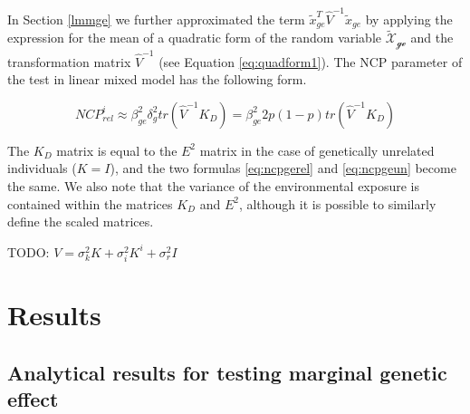 \documentclass[]{book}
\begin{document}
In Section \ref{lmmge} we further approximated the term
\(\tilde{x}_{ge}^T \hat{V}^{-1} \tilde{x}_{ge}\) by applying the
expression for the mean of a quadratic form of the random variable
\(\mathcal{\tilde{X}_{ge}}\) and the transformation matrix
\(\hat{V}^{-1}\) (see Equation \eqref{eq:quadform1}). The NCP parameter of
the test in linear mixed model has the following form.

\begin{equation}
NCP_{rel}^i \approx \beta_{ge}^2 \delta_g^2 tr(\hat{V}^{-1} K_{D}) = \beta_{ge}^2 2 p (1 - p) tr(\hat{V}^{-1} K_{D})
\label{eq:ncpgerel}
\end{equation}

The \(K_{D}\) matrix is equal to the \(E^2\) matrix in the case of
genetically unrelated individuals (\(K = I\)), and the two formulas
\eqref{eq:ncpgerel} and \eqref{eq:ncpgeun} become the same. We also note
that the variance of the environmental exposure is contained within the
matrices \(K_{D}\) and \(E^2\), although it is possible to similarly
define the scaled matrices.

TODO: \(V = \sigma^2_k K + \sigma^2_i K^i + \sigma^2_r I\)
\citep{Sul2016}

\section{Results}\label{results}

\subsection{Analytical results for testing marginal genetic
effect}\label{analytical-results-for-testing-marginal-genetic-effect}
\end{document}
